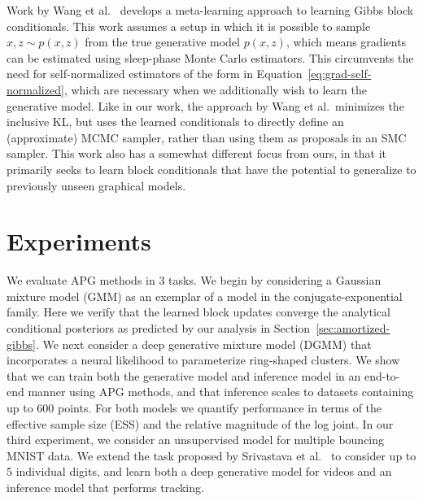 \documentclass{article}
\theoremstyle{definition}
\begin{document}
Work by Wang et al.~\cite{wang2018meta} develops a meta-learning approach to learning Gibbs block conditionals. This work assumes a setup in which it is possible to sample $x, z \sim p(x, z)$ from the true generative model $p(x,z)$, which means gradients can be estimated using sleep-phase Monte Carlo estimators. This circumvents the need for self-normalized estimators of the form in Equation~\ref{eq:grad-self-normalized}, which are necessary when we additionally wish to learn the generative model. Like in our work, the approach by Wang et al.~minimizes the inclusive KL, but uses the learned conditionals to directly define an (approximate) MCMC sampler, rather than using them as proposals in an SMC sampler. This work also has a somewhat different focus from ours, in that it primarily seeks to learn block conditionals that have the potential to generalize to previously unseen graphical models.


\section{Experiments}
\label{sec:experiments}

We evaluate APG methods in 3 tasks. We begin by considering a Gaussian mixture model (GMM) as an exemplar of a model in the conjugate-exponential family. Here we verify that the learned block updates converge the analytical conditional posteriors as predicted by our analysis in Section~\ref{sec:amortized-gibbs}. We next consider a deep generative mixture model (DGMM) that incorporates a neural likelihood to parameterize ring-shaped clusters. We show that we can train both the generative model and inference model in an end-to-end manner using APG methods, and that inference scales to datasets containing up to 600 points. For both models we quantify performance in terms of the effective sample size (ESS) and the relative magnitude of the log joint. In our third experiment, we consider an unsupervised model for multiple bouncing MNIST data. We extend the task proposed by Srivastava et al.~\cite{srivastava2015unsupervised} to consider up to 5 individual digits, and learn both a deep generative model for videos and an inference model that performs tracking.
\end{document}
